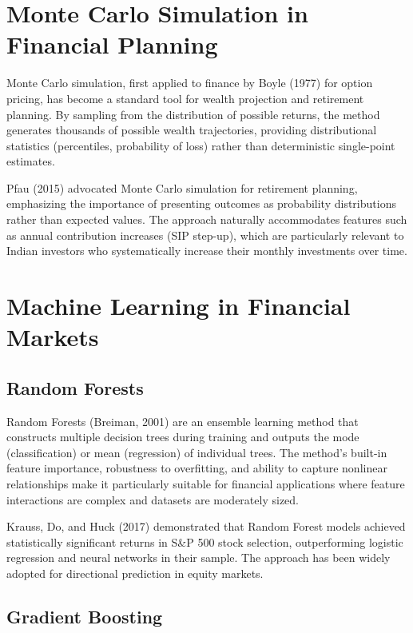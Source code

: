 \documentclass[12pt, a4paper, oneside]{report}
\begin{document}
\section{Monte Carlo Simulation in Financial Planning}
\label{sec:lit_montecarlo}

Monte Carlo simulation, first applied to finance by Boyle (1977) for option pricing, has become a standard tool for wealth projection and retirement planning. By sampling from the distribution of possible returns, the method generates thousands of possible wealth trajectories, providing distributional statistics (percentiles, probability of loss) rather than deterministic single-point estimates.

Pfau (2015) advocated Monte Carlo simulation for retirement planning, emphasizing the importance of presenting outcomes as probability distributions rather than expected values. The approach naturally accommodates features such as annual contribution increases (SIP step-up), which are particularly relevant to Indian investors who systematically increase their monthly investments over time.

\section{Machine Learning in Financial Markets}
\label{sec:lit_ml}

\subsection{Random Forests}

Random Forests (Breiman, 2001) are an ensemble learning method that constructs multiple decision trees during training and outputs the mode (classification) or mean (regression) of individual trees. The method's built-in feature importance, robustness to overfitting, and ability to capture nonlinear relationships make it particularly suitable for financial applications where feature interactions are complex and datasets are moderately sized.

Krauss, Do, and Huck (2017) demonstrated that Random Forest models achieved statistically significant returns in S\&P 500 stock selection, outperforming logistic regression and neural networks in their sample. The approach has been widely adopted for directional prediction in equity markets.

\subsection{Gradient Boosting}
\end{document}
